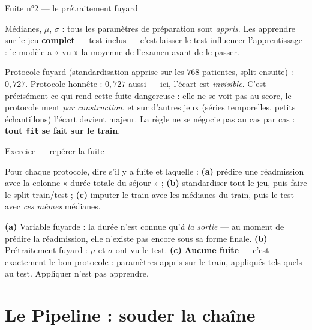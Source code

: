 \documentclass[aspectratio=169,11pt]{beamer}
\begin{document}
\begin{frame}{Fuite n°2 — le prétraitement fuyard}
\begin{ucaddef}[Le mécanisme]
{\small Médianes, $\mu$, $\sigma$ : tous les paramètres de préparation sont \emph{appris}. Les apprendre sur le jeu \textbf{complet} — test inclus — c'est laisser le test influencer l'apprentissage : le modèle a « vu » la moyenne de l'examen avant de le passer.}
\end{ucaddef}
\begin{ucadex}
{\small Protocole fuyard (standardisation apprise sur les $768$ patientes, split ensuite) : $0{,}727$. Protocole honnête : $0{,}727$ aussi — ici, l'écart est \emph{invisible}. C'est précisément ce qui rend cette fuite dangereuse : elle ne se voit pas au score, le protocole ment \emph{par construction}, et sur d'autres jeux (séries temporelles, petits échantillons) l'écart devient majeur. La règle ne se négocie pas au cas par cas : \textbf{tout \texttt{fit} se fait sur le train}.}
\end{ucadex}
\end{frame}

\begin{frame}{Exercice — repérer la fuite}
\begin{ucadrec}[Énoncé]
{\small Pour chaque protocole, dire s'il y a fuite et laquelle : \textbf{(a)} prédire une réadmission avec la colonne « durée totale du séjour » ; \textbf{(b)} standardiser tout le jeu, puis faire le split train/test ; \textbf{(c)} imputer le train avec les médianes du train, puis le test avec \emph{ces mêmes} médianes.}
\end{ucadrec}
\pause
\begin{ucadex}[Correction]
{\small \textbf{(a)} Variable fuyarde : la durée n'est connue qu'\emph{à la sortie} — au moment de prédire la réadmission, elle n'existe pas encore sous sa forme finale. \textbf{(b)} Prétraitement fuyard : $\mu$ et $\sigma$ ont vu le test. \textbf{(c)} \textbf{Aucune fuite} — c'est exactement le bon protocole : paramètres appris sur le train, appliqués tels quels au test. Appliquer n'est pas apprendre.}
\end{ucadex}
\end{frame}

\section{Le Pipeline : souder la chaîne}
\end{document}
